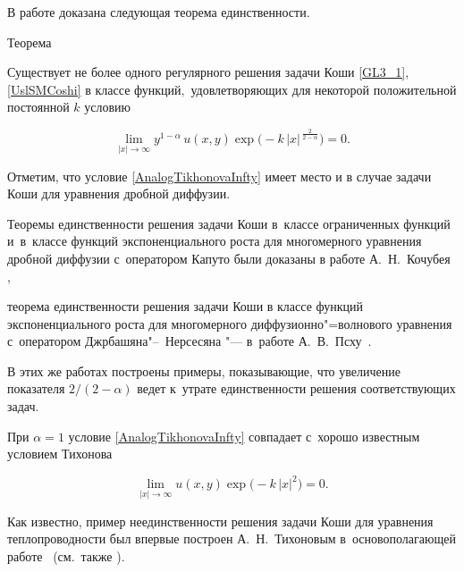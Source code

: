 В работе \cite{KhushtovaVestn2} доказана следующая теорема единственности.



\smallskip



\begin{newthm}{Теорема}  

Существует не более одного регулярного решения задачи Коши {\rm \eqref{GL3_1}, \eqref{UslSMCoshi} } в классе функций$,$ удовлетворяющих для некоторой положительной постоянной $k$ условию

\begin{equation} \label{AnalogTikhonovaInfty}

\lim\limits_{|x|\to \infty}y^{1-\alpha}\,u(x,y)\exp{\big(-k\,|x|^{\,\frac{2}{2-\alpha}} \big)}=0.

\end{equation}  

\end{newthm}



\smallskip





Отметим, что условие \eqref{AnalogTikhonovaInfty} имеет место и в случае задачи Коши для уравнения дробной диффузии.  

Теоремы единственности решения задачи Коши в~классе ограниченных функций  и~в~классе функций экспоненциального роста для многомерного уравнения дробной диффузии с~оператором Капуто были доказаны в работе А.~Н.~Кочубея \cite{Kochubei_2},

теорема единственности решения задачи Коши в классе функций экспоненциального роста для многомерного диффузионно"=волнового уравнения с~оператором Джрбашяна"--~Нерсесяна  "--- в~работе А.~В.~Псху~\cite{Pskhu2}. 

В этих же работах построены примеры, показывающие, что увеличение показателя $2/(2-\alpha)$ ведет к~утрате единственности решения соответствующих задач. 

При $\alpha=1$ условие \eqref{AnalogTikhonovaInfty} совпадает с~хорошо известным условием Тихонова 

$$

\lim\limits_{|x|\to \infty}u(x,y)\exp{\big(-k\,|x|^{2} \big)}=0.

$$

Как известно, пример неединственности решения задачи Коши для уравнения теплопроводности был впервые построен А.~Н.~Тихоновым в~основополагающей работе~\cite{tikhonovUsl-1} (см.~также \cite{tikhonovUsl-2}).



